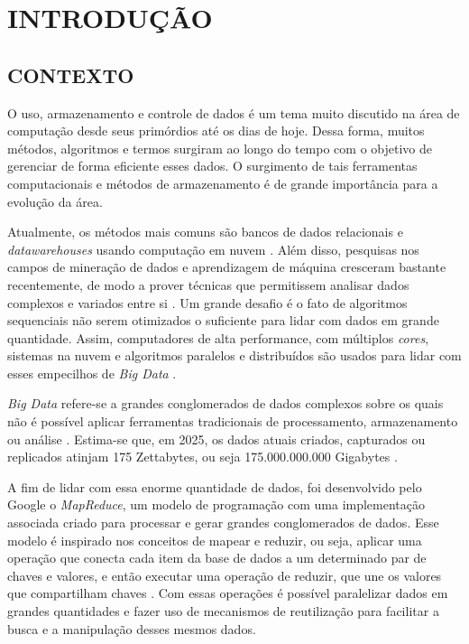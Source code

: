 \chapter{INTRODUÇÃO} \label{cha:introducao}

\section{CONTEXTO} \label{sec:contexto}

O uso, armazenamento e controle de dados é um tema muito discutido na área de computação desde seus primórdios até os dias de hoje. Dessa forma, muitos métodos, algoritmos e termos surgiram ao longo do tempo com o objetivo de gerenciar de forma eficiente esses dados. O surgimento de tais ferramentas computacionais e métodos de armazenamento é de grande importância para a evolução da área.

Atualmente, os métodos mais comuns são bancos de dados relacionais e \textit{\gls{datawarehouse}s} usando computação em nuvem \cite{PastAndFutureTrendsData19}. Além disso, pesquisas nos campos de mineração de dados e aprendizagem de máquina cresceram bastante recentemente, de modo a prover técnicas que permitissem analisar dados complexos e variados entre si \cite{ProgrammingBigData22}. Um grande desafio é o fato de algoritmos sequenciais não serem otimizados o suficiente para lidar com dados em grande quantidade. Assim, computadores de alta performance, com múltiplos \textit{\gls{cores}}, sistemas na nuvem e algoritmos paralelos e distribuídos são usados para lidar com esses empecilhos de \textit{Big Data} \cite{ProgrammingBigData22}.

\textit{Big Data} refere-se a grandes conglomerados de dados complexos sobre os quais não é possível aplicar ferramentas tradicionais de processamento, armazenamento ou análise \cite{OptmizationSoftwareHadoop18}. Estima-se que, em 2025, os dados atuais criados, capturados ou replicados atinjam 175 Zettabytes, ou seja 175.000.000.000 Gigabytes \cite{DigitalizationWorld18}.

A fim de lidar com essa enorme quantidade de dados, foi desenvolvido pelo Google o \textit{MapReduce}, um modelo de programação com uma implementação associada criado para processar e gerar grandes conglomerados de dados. Esse modelo é inspirado nos conceitos de mapear e reduzir, ou seja, aplicar uma operação que conecta cada item da base de dados a um determinado par de chaves e valores, e então executar uma operação de reduzir, que une os valores que compartilham chaves \cite{MapReduce08}. Com essas operações é possível paralelizar dados em grandes quantidades e fazer uso de mecanismos de reutilização para facilitar a busca e a manipulação desses mesmos dados.

